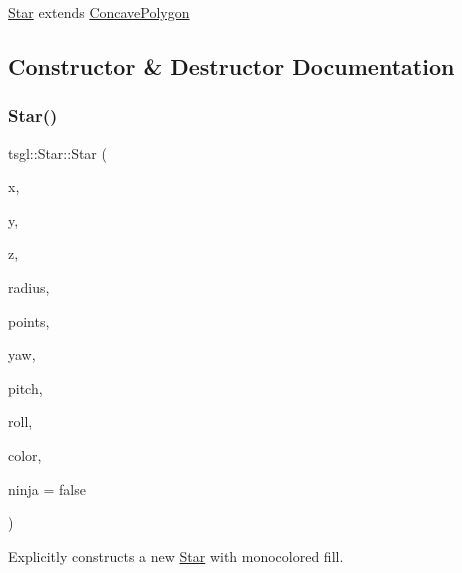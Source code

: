 \hyperlink{classtsgl_1_1_star}{Star} extends \hyperlink{classtsgl_1_1_concave_polygon}{Concave\+Polygon} 

\subsection{Constructor \& Destructor Documentation}
\mbox{\label{classtsgl_1_1_star_aab27c892812fbfdd38f6120e7fd51d54}} 
\subsubsection{\texorpdfstring{Star()}{Star()}\hspace{0.1cm}{\footnotesize\ttfamily [1/2]}}
{\footnotesize\ttfamily tsgl\+::\+Star\+::\+Star (\begin{DoxyParamCaption}\item[{float}]{x,  }\item[{float}]{y,  }\item[{float}]{z,  }\item[{G\+Lfloat}]{radius,  }\item[{int}]{points,  }\item[{float}]{yaw,  }\item[{float}]{pitch,  }\item[{float}]{roll,  }\item[{\hyperlink{structtsgl_1_1_color_float}{Color\+Float}}]{color,  }\item[{bool}]{ninja = {\ttfamily false} }\end{DoxyParamCaption})}



Explicitly constructs a new \hyperlink{classtsgl_1_1_star}{Star} with monocolored fill. 

